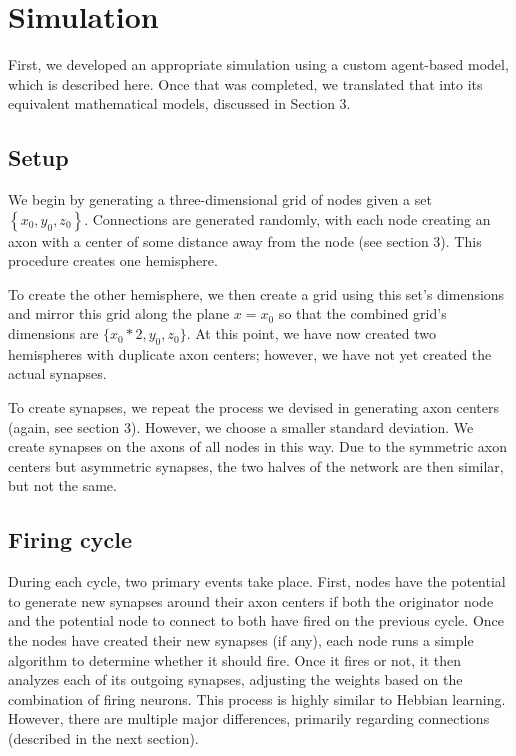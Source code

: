 \documentclass[12pt]{article}
\begin{document}
\newpage

\section{Simulation}

First, we developed an appropriate simulation using a custom agent-based model, which is described here.  Once that was completed, we translated that into its equivalent mathematical models, discussed in Section 3.

\subsection{Setup}

We begin by generating a three-dimensional grid of nodes given a set $\left\{x_0, y_0, z_0\right\}$.  Connections are generated randomly, with each node creating an axon with a center of some distance away from the node (see section 3).  This procedure creates one hemisphere.

To create the other hemisphere, we then create a grid using this set's dimensions and mirror this grid along the plane $x = x_0$ so that the combined grid's dimensions are $\{x_0 * 2, y_0, z_0\}$.  At this point, we have now created two hemispheres with duplicate axon centers; however, we have not yet created the actual synapses.

To create synapses, we repeat the process we devised in generating axon centers (again, see section 3).  However, we choose a smaller standard deviation.  We create synapses on the axons of all nodes in this way.  Due to the symmetric axon centers but asymmetric synapses, the two halves of the network are then similar, but not the same.

\subsection{Firing cycle}

During each cycle, two primary events take place.  First, nodes have the potential to generate new synapses around their axon centers if both the originator node and the potential node to connect to both have fired on the previous cycle.  Once the nodes have created their new synapses (if any), each node runs a simple algorithm to determine whether it should fire.  Once it fires or not, it then analyzes each of its outgoing synapses, adjusting the weights based on the combination of firing neurons.  This process is highly similar to Hebbian learning.  However, there are multiple major differences, primarily regarding connections (described in the next section).
\end{document}
